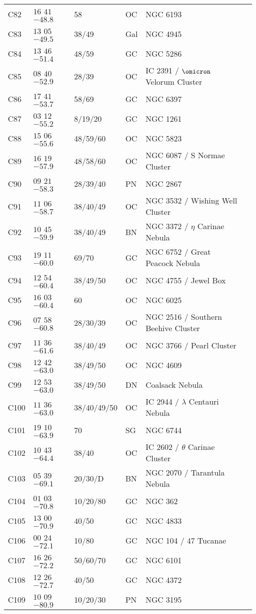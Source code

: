 \begin{table}[p]
\begin{tabular}{llllll}
C82&$16$ $41$ $-48.8$&58&OC&NGC 6193\\
C83&$13$ $05$ $-49.5$&38/49&Gal&NGC 4945\\
C84&$13$ $46$ $-51.4$&48/59&GC&NGC 5286\\
C85&$08$ $40$ $-52.9$&28/39&OC&IC 2391 / $\omicron$ Velorum Cluster\\
C86&$17$ $41$ $-53.7$&58/69&GC&NGC 6397\\
C87&$03$ $12$ $-55.2$&8/19/20&GC&NGC 1261\\
C88&$15$ $06$ $-55.6$&48/59/60&OC&NGC 5823\\
C89&$16$ $19$ $-57.9$&48/58/60&OC&NGC 6087 / S Normae Cluster\\
C90&$09$ $21$ $-58.3$&28/39/40&PN&NGC 2867\\
C91&$11$ $06$ $-58.7$&38/40/49&OC&NGC 3532 / Wishing Well Cluster\\
C92&$10$ $45$ $-59.9$&38/40/49&BN&NGC 3372 / $\eta$ Carinae Nebula\\
C93&$19$ $11$ $-60.0$&69/70&GC&NGC 6752 / Great Peacock Nebula\\
C94&$12$ $54$ $-60.4$&38/49/50&OC&NGC 4755 / Jewel Box\\
C95&$16$ $03$ $-60.4$&60&OC&NGC 6025\\
C96&$07$ $58$ $-60.8$&28/30/39&OC&NGC 2516 / Southern Beehive Cluster\\
C97&$11$ $36$ $-61.6$&38/40/49&OC&NGC 3766 / Pearl Cluster\\
C98&$12$ $42$ $-63.0$&38/49/50&OC&NGC 4609\\
C99&$12$ $53$ $-63.0$&38/49/50&DN&Coalsack Nebula\\
C100&$11$ $36$ $-63.0$&38/40/49/50&OC&IC 2944 / $\lambda$ Centauri Nebula\\
C101&$19$ $10$ $-63.9$&70&SG&NGC 6744\\
C102&$10$ $43$ $-64.4$&38/40&OC&IC 2602 / $\theta$ Carinae Cluster\\
C103&$05$ $39$ $-69.1$&20/30/D&BN&NGC 2070 / Tarantula Nebula\\
C104&$01$ $03$ $-70.8$&10/20/80&GC&NGC 362\\
C105&$13$ $00$ $-70.9$&40/50&GC&NGC 4833\\
C106&$00$ $24$ $-72.1$&10/80&GC&NGC 104 / 47 Tucanae\\
C107&$16$ $26$ $-72.2$&50/60/70&GC&NGC 6101\\
C108&$12$ $26$ $-72.7$&40/50&GC&NGC 4372\\
C109&$10$ $09$ $-80.9$&10/20/30&PN&NGC 3195\\
\hline
\end{tabular}
\end{table}

